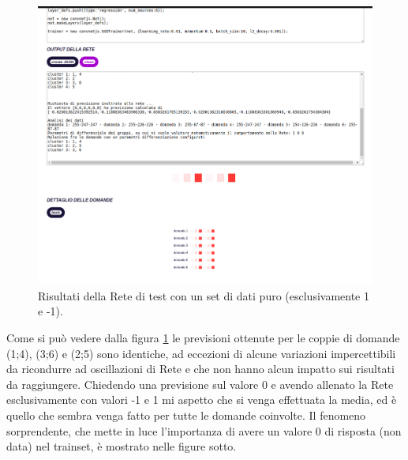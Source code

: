 \begin{figure}[H]
\centering
	\includegraphics[width=1\linewidth]{./image/RetediProva_generatorinputpuro.png}
	\caption{Risultati della Rete di test con un set di dati puro (esclusivamente 1 e -1).}
	\label{Risultati della Rete di test con un set di dati puro (esclusivamente 1 e -1).}
	\end{figure}
	\noindent
Come si pu\`o vedere dalla figura \ref{Risultati della Rete di test con un set di dati puro (esclusivamente 1 e -1).} le previsioni ottenute per le coppie di domande (1;4), (3;6) e (2;5) sono identiche, ad eccezioni di alcune variazioni impercettibili da ricondurre ad oscillazioni di Rete e che non hanno alcun impatto sui risultati da raggiungere. Chiedendo una previsione sul valore 0 e avendo allenato la Rete esclusivamente con valori -1 e 1 mi aspetto che si venga effettuata la media, ed \`e quello che sembra venga fatto per tutte le domande coinvolte.
Il fenomeno sorprendente, che mette in luce l'importanza di avere un valore 0 di risposta (non data) nel trainset, \`e mostrato nelle figure sotto.

